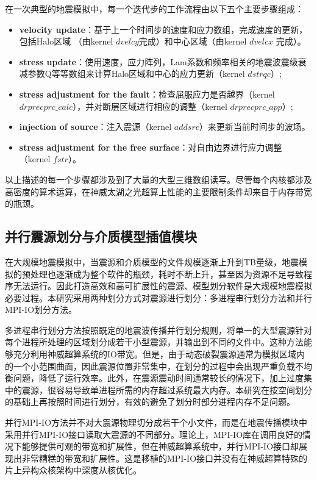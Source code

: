 \documentclass[degree=doctor]{thuthesis}
\begin{document}
在一次典型的地震模拟中，每一个迭代步的工作流程由以下五个主要步骤组成：

\begin{itemize}
\item {\bf velocity update}：基于上一个时间步的速度和应力数组，完成速度的更新，包括Halo区域 （由kernel $dvelcy$完成）和中心区域（由kernel $dvelcx$ 完成）。

\item {\bf stress update}：使用速度，应力阵列，Lam系数和频率相关的地震波震级衰减参数Q等等数组来计算Halo区域和中心的应力更新（kernel $dstrqc$）;

\item {\bf stress adjustment for the fault}：检查屈服应力是否越界（kernel $drprecprc\_calc$），并对断层区域进行相应的调整（kernel $drprecprc\_app$）;

\item {\bf injection of source}：注入震源（kernel $addsrc$）来更新当前时间步的波场。

\item {\bf stress adjustment for the free surface}：对自由边界进行应力调整（kernel $fstr$）。
\end{itemize}

以上描述的每一个步骤都涉及到了大量的大型三维数组读写。尽管每个内核都涉及高密度的算术运算，在神威太湖之光超算上性能的主要限制条件却来自于内存带宽的瓶颈。


\subsection{并行震源划分与介质模型插值模块}
\label{sub:并行震源划分与介质模型插值模块}
在大规模地震模拟中，当震源和介质模型的文件规模逐渐上升到TB量级，地震模拟的预处理也逐渐成为整个软件的瓶颈，耗时不断上升，甚至因为资源不足导致程序无法运行。因此打造高效和高可扩展性的震源、模型划分软件是大规模地震模拟必要过程。本研究采用两种划分方式对震源进行划分：多进程串行划分方法和并行MPI-IO划分方法。

多进程串行划分方法按照既定的地震波传播并行划分规则，将单一的大型震源针对每个进程所处理的区域划分成若干小型震源，并输出到不同的文件中。这种方法能够充分利用神威超算系统的IO带宽。但是，由于动态破裂震源通常为模拟区域内的一个小范围曲面，因此震源位置非常集中，在划分的过程中会出现严重负载不均衡问题，降低了运行效率。此外，在震源震动时间通常较长的情况下，加上过度集中的震源，很容易导致单进程所需的内存超过系统最大内存。本研究在按空间划分的基础上再按照时间进行划分，有效的避免了划分时部分进程内存不足问题。

并行MPI-IO方法并不对大震源物理切分成若干个小文件，而是在地震传播模块中采用并行MPI-IO接口读取大震源的不同部分。理论上，MPI-IO库在调用良好的情况下能够提供可观的带宽和扩展性，但在神威超算系统中，并行MPI-IO接口却展现出非常糟糕的带宽和扩展性。这是移植的MPI-IO接口并没有在神威超算特殊的片上异构众核架构中深度从核优化。
\end{document}
